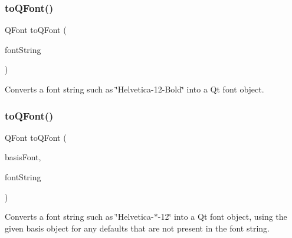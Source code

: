 \mbox{\label{classGFont_aea0f70979b631219291103391bfacc6e}} 
\subsubsection{\texorpdfstring{to\+Q\+Font()}{toQFont()}\hspace{0.1cm}{\footnotesize\ttfamily [1/2]}}
{\footnotesize\ttfamily Q\+Font to\+Q\+Font (\begin{DoxyParamCaption}\item[{const std\+::string \&}]{font\+String }\end{DoxyParamCaption})\hspace{0.3cm}{\ttfamily [static]}}



Converts a font string such as \char`\"{}\+Helvetica-\/12-\/\+Bold\char`\"{} into a Qt font object. 

\mbox{\label{classGFont_a7eea6ca714d168dc53c86124bb4fc387}} 
\subsubsection{\texorpdfstring{to\+Q\+Font()}{toQFont()}\hspace{0.1cm}{\footnotesize\ttfamily [2/2]}}
{\footnotesize\ttfamily Q\+Font to\+Q\+Font (\begin{DoxyParamCaption}\item[{const Q\+Font \&}]{basis\+Font,  }\item[{const std\+::string \&}]{font\+String }\end{DoxyParamCaption})\hspace{0.3cm}{\ttfamily [static]}}



Converts a font string such as \char`\"{}\+Helvetica-\/$\ast$-\/12\char`\"{} into a Qt font object, using the given \textquotesingle{}basis\textquotesingle{} object for any defaults that are not present in the font string. 

